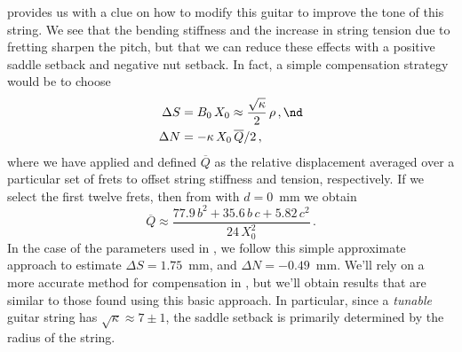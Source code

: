  provides us with a clue on how to modify this guitar to improve the tone of this string. We see that the bending stiffness and the increase in string tension due to fretting sharpen the pitch, but that we can reduce these effects with a positive saddle setback and negative nut setback. In fact, a simple compensation strategy would be to choose
\begin{subequations} \label{eqn:comp_approx}
  \begin{align}
    \Delta S &= B_0\, X_0 \approx \frac{\sqrt{\kappa}}{2}\, \rho\, , \nd \\
    \Delta N &= - \kappa\, X_0\, \overline{Q} / 2\, ,
  \end{align}
\end{subequations}
where we have applied  and defined $\overline{Q}$ as the relative displacement averaged over a particular set of frets to offset string stiffness and tension, respectively.  If we select the first twelve frets, then from  with $d = 0$~mm we obtain
\begin{equation} \label{eqn:qbar_approx}
  \overline{Q} \approx \frac{77.9\, b^2 + 35.6\, b\, c + 5.82\, c^2}{24\, X_0^2}\, .
\end{equation}
In the case of the parameters used in , we follow this simple approximate approach to estimate $\Delta S = 1.75$~mm, and $\Delta N = -0.49$~mm. We'll rely on a more accurate method for compensation in , but we'll obtain results that are similar to those found using this basic approach. In particular, since a \emph{tunable} guitar string has $\sqrt{\kappa} \approx 7 \pm 1$, the saddle setback is primarily determined by the radius of the string.
